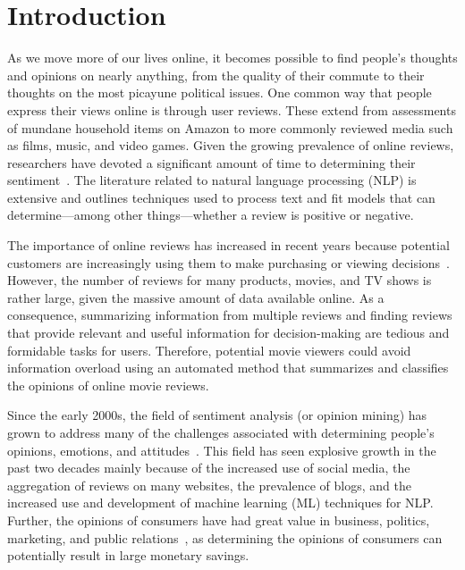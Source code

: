 \documentclass[conference]{IEEEtran}
\begin{document}
\section{Introduction}\label{sec:Intro}
As we move more of our lives online, it becomes possible to find people's thoughts and opinions on nearly anything, from the quality of their commute to their thoughts on the most picayune political issues. One common way that people express their views online is through user reviews. These extend from assessments of mundane household items on Amazon to more commonly reviewed media such as films, music, and video games. Given the growing prevalence of online reviews, researchers have devoted a significant amount of time to determining their sentiment~\cite{ref:PangJour, ref:Sun, ref:BLiu}. The literature related to natural language processing (NLP) is extensive and outlines techniques used to process text and fit models that can determine---among other things---whether a review is positive or negative.

The importance of online reviews has increased in recent years because potential customers are increasingly using them to make purchasing or viewing decisions~\cite{ref:PangJour, ref:BLiu}. However, the number of reviews for many products, movies, and TV shows is rather large, given the massive amount of data available online. As a consequence, summarizing information from multiple reviews and finding reviews that provide relevant and useful information for decision-making are tedious and formidable tasks for users. Therefore, potential movie viewers could avoid information overload using an automated method that summarizes and classifies the opinions of online movie reviews.

Since the early 2000s, the field of sentiment analysis (or opinion mining) has grown to address many of the challenges associated with determining people's opinions, emotions, and attitudes~\cite{ref:PangJour, ref:Sun, ref:BLiu}. This field has seen explosive growth in the past two decades mainly because of the increased use of social media, the aggregation of reviews on many websites, the prevalence of blogs, and the increased use and development of machine learning (ML) techniques for NLP. Further, the opinions of consumers have had great value in business, politics, marketing, and public relations~\cite{ref:BLiu}, as determining the opinions of consumers can potentially result in large monetary savings.
\end{document}
